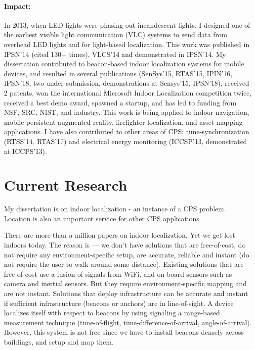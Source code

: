 \documentclass[10pt]{article}
\begin{document}

\paragraph{Impact:}  In 2013, when LED lights were phasing out
incandescent lights, I designed one of the earliest visible light
communication (VLC) systems to send data from overhead LED lights and
for light-based localization. This work was published in IPSN'14
(cited 130+ times), VLCS'14 and demonstrated in IPSN'14.  My
dissertation contributed to beacon-based indoor localization systems
for mobile devices, and resulted in several publications (SenSys'15,
RTAS'15, IPIN'16, IPSN'18, two under submission, demonstrations at
Sensys'15, IPSN'18), received 2 patents, won the international
Microsoft Indoor Localization competition twice, received a best demo
award, spawned a startup, and has led to funding from NSF, SRC, NIST, and
industry. This work is being applied to indoor navigation, mobile
persistent augmented reality, firefighter localization, and asset
mapping applications.  I have also contributed to other areas of CPS:
time-synchronization (RTSS'14, RTAS'17) and electrical energy
monitoring (ICCSP'13, demonstrated at ICCPS'13).

\section{Current Research}

My dissertation is on indoor localization - an instance of a CPS problem. Location is also an important service for other CPS applications.

There are more than a million papers on indoor localization. Yet we get lost indoors today. The reason is --- we don't have solutions that are free-of-cost, do not require any environment-specific setup, are accurate, reliable and instant (do not require the user to walk around some distance). Existing solutions that are free-of-cost use a fusion of signals from WiFi, and on-board sensors such as camera and inertial sensors. But they require environment-specific mapping and are not instant. Solutions that deploy infrastructure can be accurate and instant if sufficient infrastructure (beacons or anchors) are in line-of-sight. A device localizes itself with respect to beacons by using signaling a range-based measurement technique (time-of-flight, time-difference-of-arrival, angle-of-arrival). However, this system is not free since we have to install beacons densely across buildings, and setup and map them. \\
\end{document}
